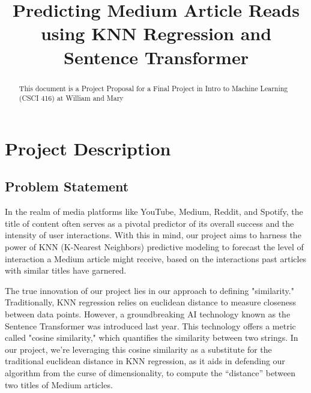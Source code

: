 \documentclass[conference]{IEEEtran}
\begin{document}
\title{Predicting Medium Article Reads using KNN Regression and Sentence Transformer\\
}

\author{
\and
{}
\and
{}
}

\maketitle

\begin{abstract}
This document is a Project Proposal for a Final Project in Intro to Machine Learning (CSCI 416) at William and Mary
\end{abstract}

\section{Project Description}

\subsection{Problem Statement}
In the realm of media platforms like YouTube, Medium, Reddit, and Spotify, the title of content often serves as a pivotal predictor of its overall success and the intensity of user interactions. With this in mind, our project aims to harness the power of KNN (K-Nearest Neighbors) predictive modeling to forecast the level of interaction a Medium article might receive, based on the interactions past articles with similar titles have garnered.

The true innovation of our project lies in our approach to defining "similarity." Traditionally, KNN regression relies on euclidean distance to measure closeness between data points. However, a groundbreaking AI technology known as the Sentence Transformer was introduced last year. This technology offers a metric called "cosine similarity," which quantifies the similarity between two strings. In our project, we're leveraging this cosine similarity as a substitute for the traditional euclidean distance in KNN regression, as it aids in defending our algorithm from the curse of dimensionality, to compute the “distance” between two titles of Medium articles. 
\end{document}
